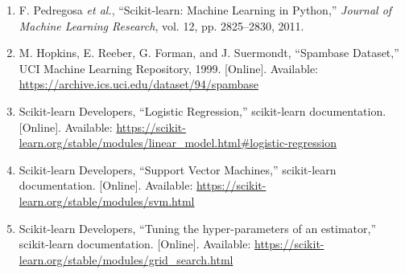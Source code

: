 \documentclass[12pt,a4paper]{article}
\begin{document}
\begin{enumerate}
\item F. Pedregosa \emph{et al.}, ``Scikit-learn: Machine Learning in Python,'' \emph{Journal of Machine Learning Research}, vol. 12, pp. 2825--2830, 2011.
\item M. Hopkins, E. Reeber, G. Forman, and J. Suermondt, ``Spambase Dataset,'' UCI Machine Learning Repository, 1999. [Online]. Available: \url{https://archive.ics.uci.edu/dataset/94/spambase}
\item Scikit-learn Developers, ``Logistic Regression,'' scikit-learn documentation. [Online]. Available: \url{https://scikit-learn.org/stable/modules/linear_model.html#logistic-regression}
\item Scikit-learn Developers, ``Support Vector Machines,'' scikit-learn documentation. [Online]. Available: \url{https://scikit-learn.org/stable/modules/svm.html}
\item Scikit-learn Developers, ``Tuning the hyper-parameters of an estimator,'' scikit-learn documentation. [Online]. Available: \url{https://scikit-learn.org/stable/modules/grid_search.html}
\end{enumerate}
\end{document}
